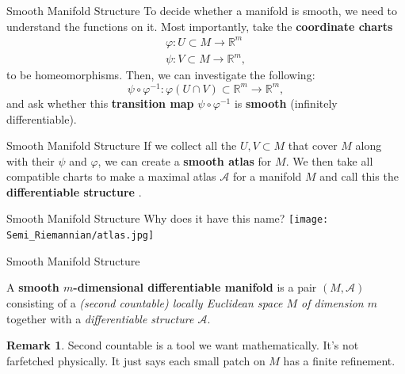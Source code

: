 \documentclass[usenames,dvipsnames]{beamer}
\theoremstyle{definition}
\newtheorem*{remark}{Remark}
\theoremstyle{theorem}
\newcommand{\R}{\mathbb{R}}
\begin{document}
        \begin{frame}{Smooth Manifold Structure}
            To decide whether a manifold is smooth, we need to understand the functions on it. Most importantly, take the \textbf{coordinate charts}
            \begin{align*}
                \varphi \colon U\subset M \to \R^m\\
                \psi \colon V\subset M \to \R^m,
            \end{align*}
            to be homeomorphisms.  Then, we can investigate the following:
            \[
            \psi \circ \varphi^{-1} \colon \varphi(U\cap V)\subset \R^m \to \R^m,
            \]
            and ask whether this \textbf{transition map} $\psi \circ \varphi^{-1}$ is \textbf{smooth} (infinitely differentiable).
        \end{frame}
        
        \begin{frame}{Smooth Manifold Structure}
            If we collect all the $U,V \subset M$ that cover $M$ along with their $\psi$ and $\varphi$, we can create a \textbf{smooth atlas} for $M$.  We then take all compatible charts to make a maximal atlas $\mathcal{A}$ for a manifold $M$ and call this the \textbf{differentiable structure} .
        \end{frame}
        
        \begin{frame}{Smooth Manifold Structure}
        Why does it have this name?
            \texttt{[image: Semi\_Riemannian/atlas.jpg]}
        \end{frame}
    
        \begin{frame}{Smooth Manifold Structure}
            \begin{definition}
                A \textbf{smooth $m$-dimensional differentiable manifold} is a pair $(M,\mathcal{A})$ consisting of a \emph{(second countable) locally Euclidean space $M$ of dimension $m$} together with a \emph{differentiable structure $\mathcal{A}$}.
            \end{definition}
            \begin{remark}
                Second countable is a tool we want mathematically.  It's not farfetched physically. It just says each small patch on $M$ has a finite refinement.
            \end{remark}
        \end{frame}
\end{document}

